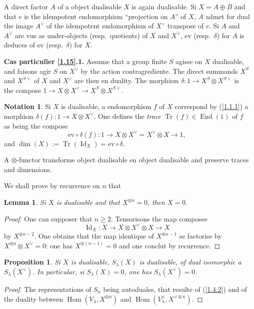 \documentclass[11pt,a4paper]{article}
\theoremstyle{plain}
\newtheorem{lemma}[theorem]{Lemma}
\newtheorem{proposition}[theorem]{Proposition}
\theoremstyle{definition}
\newtheorem{notation}[theorem]{Notation}
\DeclareMathOperator{\Hom}{Hom}
\DeclareMathOperator{\End}{End}
\DeclareMathOperator{\Tr}{Tr}
\DeclareMathOperator{\Id}{Id}
\newcommand{\ev}{\mathrm{ev}}
\begin{document}
A direct factor $A$ of a object dualisable $X$ is again dualisable. Si $X=A\oplus B$ and that $e$ is the idempotent endomorphism ``projection on $A$'' of $X$, $A$ admet for dual the image $A^\vee$ of the idempotent endomorphism of $X^\vee$ transpose of $e$. Si $A$ and $A^\vee$ are vus as under-objects (resp.~quotients) of $X$ and $X^\vee$, $\ev$ (resp.~$\delta$) for $A$ is deduces of $\ev$ (resp.~$\delta$) for $X$.

\medskip\noindent\textbf{Cas particulier \ref{1.15}.1.} Assume that a group finite $S$ agisse on $X$ dualisable, and faisons agir $S$ on $X^\vee$ by the action contragrediente. The direct summands $X^S$ and $X^{S\vee}$ of $X$ and $X^\vee$ are then en duality. The morphism $\delta:1\to X^S\otimes X^{S\vee}$ is the compose $1\to X\otimes X^\vee\to X^S\otimes X^{S\vee}$.

\begin{notation}\label{1.16}
Si $X$ is dualisable, a endomorphism $f$ of $X$ correspond by (\ref{1.1.1}) a morphism $\delta(f):1\to X\otimes X^\vee$. One defines the \emph{trace} $\Tr(f)\in\End(1)$ of $f$ as being the compose
\[
\ev\circ\delta(f):1\to X\otimes X^\vee=X^\vee\otimes X\to 1,
\]
and $\dim(X):=\Tr(\Id_X)=\ev\circ\delta$.
\end{notation}

A $\otimes$-functor transforme object dualisable en object dualisable and preserve traces and dimensions.

We shall prove by recurrence on $n$ that

\begin{lemma}\label{1.17}
Si $X$ is dualisable and that $X^{\otimes n}=0$, then $X=0$.
\end{lemma}

\begin{proof}
One can supposer that $n\geq2$. Tensorisons the map composee
\[
\Id_X:X\to X\otimes X^\vee\otimes X\to X
\]
by $X^{\otimes n-2}$. One obtains that the map identique of $X^{\otimes n-1}$ se factorise by $X^{\otimes n}\otimes X^\vee=0$: one has $X^{\otimes(n-1)}=0$ and one conclut by recurrence.
\end{proof}

\begin{proposition}\label{1.18}
Si $X$ is dualisable, $S_\lambda(X)$ is dualisable, of dual isomorphic a $S_\lambda(X^\vee)$. In particular, si $S_\lambda(X)=0$, one has $S_\lambda(X^\vee)=0$.
\end{proposition}

\begin{proof}
The representations of $S_n$ being autoduales, that resulte of (\ref{1.4.2}) and of the duality between $\Hom(V_\lambda,X^{\otimes n})$ and $\Hom(V_\lambda^\vee,X^{\vee\otimes n})$.
\end{proof}
\end{document}
